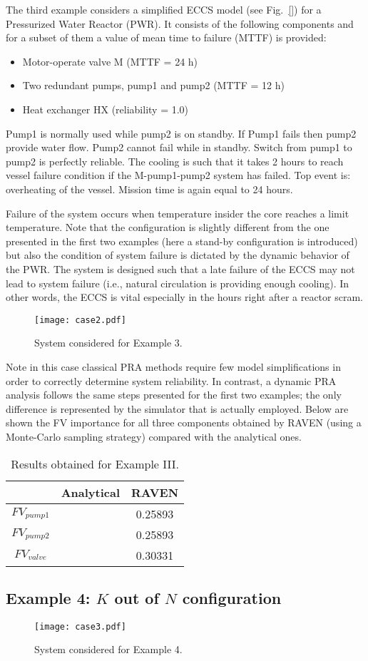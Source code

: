 The third example considers a simplified ECCS model (see Fig.~\ref{}) for a Pressurized 
Water Reactor (PWR). It consists of the following components and for a subset of them a 
value of mean time to failure (MTTF) is provided:
\begin{itemize}
  \item Motor-operate valve M (MTTF = 24 h)
  \item Two redundant pumps, pump1 and pump2 (MTTF = 12 h)
  \item Heat exchanger HX (reliability = 1.0)
\end{itemize}

Pump1 is normally used while pump2 is on standby. If Pump1 fails then pump2 provide water flow. 
Pump2 cannot fail while in standby. Switch from pump1 to pump2 is perfectly reliable. 
The cooling is such that it takes 2 hours to reach vessel failure condition if the M-pump1-pump2 
system has failed. Top event is: overheating of the vessel. Mission time is again equal to 24 hours.

Failure of the system occurs when temperature insider the core reaches a limit temperature. 
Note that the configuration is slightly different from the one presented in the first two 
examples (here a stand-by configuration is introduced) but also the condition of system failure 
is dictated by the dynamic behavior of the PWR.  The system is designed such that a late failure 
of the ECCS may not lead to system failure (i.e., natural circulation is providing enough cooling). 
In other words, the ECCS is vital especially in the hours right after a reactor scram.

\begin{figure}
    \centering
    \centerline{\texttt{[image: case2.pdf]}}
    \caption{System considered for Example 3.}
    \label{fig:example3}
\end{figure}

Note in this case classical PRA methods require few model simplifications in order to correctly 
determine system reliability.
In contrast, a dynamic PRA analysis follows the same steps presented for the first two examples; 
the only difference is represented by the simulator that is actually employed.
Below are shown the FV importance for all three components obtained by RAVEN (using a Monte-Carlo 
sampling strategy) compared with the analytical ones.

\begin{table}
  \caption{Results obtained for Example III.} 
  \centering 
  \begin{tabular}{c | c | c } 
    \hline 
     & Analytical & RAVEN \\ 
    \hline 
    $FV_{pump1}$ &   & 0.25893  \\
    $FV_{pump2}$ &   & 0.25893   \\
    $FV_{valve}$ &   & 0.30331   \\
    \hline 
  \end{tabular}
  \label{tab:example3} 
\end{table}

\subsection{Example 4: $K$ out of $N$ configuration}
\label{sec:example4}

\begin{figure}
    \centering
    \centerline{\texttt{[image: case3.pdf]}}
    \caption{System considered for Example 4.}
    \label{fig:example4}
\end{figure}
